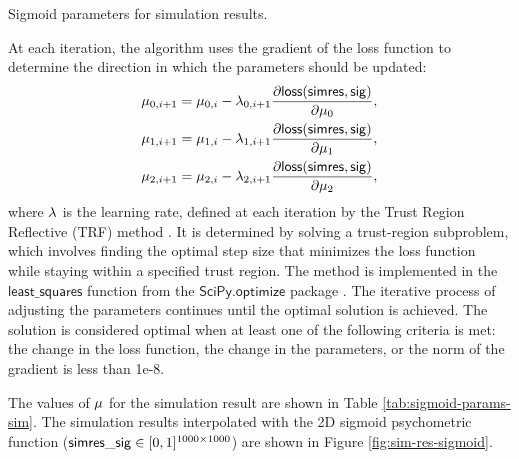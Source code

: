 \begin{table}[b]
    \centering
    
    \caption[Sigmoid parameters for simulation results]{Sigmoid parameters for simulation results.}
    \label{tab:sigmoid-params-sim}
\end{table}

At each iteration, the algorithm uses the gradient of the loss function to determine the direction in which the parameters should be updated:
\begin{align}
\begin{split}
    \mu_{0, i+1} &= \mu_{0, i} - \lambda_{0, i+1}
    \frac{
        \partial \mathsf{loss}(\mathsf{simres}, \mathsf{sig})
    }{
        \partial {\mu_0}
    }, 
    \\
    \mu_{1, i+1} &= \mu_{1, i} - \lambda_{1, i+1}
    \frac{
        \partial \mathsf{loss}(\mathsf{simres}, \mathsf{sig})
    }{
        \partial {\mu_1}
    }, 
    \\
    \mu_{2, i+1} &= \mu_{2, i} - \lambda_{2, i+1}
    \frac{
        \partial \mathsf{loss}(\mathsf{simres}, \mathsf{sig})
    }{
        \partial {\mu_2}
    }, 
\end{split}
\end{align}
where $\lambda$ is the learning rate, defined at each iteration by the Trust Region Reflective (TRF) method \cite{Branch1999}. It is determined by solving a trust-region subproblem, which involves finding the optimal step size that minimizes the loss function while staying within a specified trust region. The method is implemented in the $\mathsf{least\_squares}$ function from the $\mathsf{SciPy.optimize}$ package \cite{SciPy:least_squares}. The iterative process of adjusting the parameters continues until the optimal solution is achieved. The solution is considered optimal when at least one of the following criteria is met: the change in the loss function, the change in the parameters, or the norm of the gradient is less than 1e-8.

The values of $\mu$ for the simulation result are shown in Table \ref{tab:sigmoid-params-sim}.
The simulation results interpolated with the 2D sigmoid psychometric function ($\mathsf{simres\_sig} \in [0, 1]^{1000 \times 1000}$) are shown in Figure \ref{fig:sim-res-sigmoid}.
